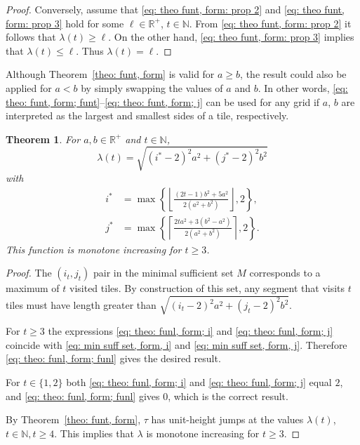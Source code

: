 \documentclass[12pt, a4paper]{article}
\newcommand{\funt}{\tau} %
\newcommand{\funl}{\lambda} %
\newcommand{\len}{\ell} %
\newcommand{\tiles}{t} %
\newcommand{\isoli}{i^\ast}
\newcommand{\jsoli}{j^\ast}
\newcommand{\mss}{M}
\newcommand{\touches}{visits}
\newcommand{\touched}{visited}
\newtheorem{theorem}{Theorem}%
\begin{document}
\begin{proof}
Conversely, assume that \eqref{eq: theo funt, form: prop 2} and \eqref{eq: theo funt, form: prop 3} hold for some $\len \in \mathbb R^+$, $\tiles \in \mathbb N$. From \eqref{eq: theo funt, form: prop 2} it follows that  $\funl(\tiles) \geq \len$. On the other hand, \eqref{eq: theo funt, form: prop 3} implies that $\funl(\tiles) \leq \len$. Thus $\funl(\tiles)=\len$.
\end{proof}

Although Theorem~\ref{theo: funt, form} is valid for $a \geq b$, the result could also be applied for $a < b$ by simply swapping the values of $a$ and $b$. In other words, \eqref{eq: theo: funt, form; funt}--\eqref{eq: theo: funt, form; j}
can be used for any grid if $a$, $b$ are interpreted as the largest and smallest sides of a tile, respectively.

\begin{theorem}
\label{theo: funl, form}
For $a, b \in \mathbb R^+$ and $\tiles \in \mathbb N$,
\begin{equation}
\label{eq: theo: funl, form; funl}
\funl(\tiles) = \sqrt{(\isoli-2)^2 a^2 + (\jsoli-2)^2 b^2}
\end{equation}
with
\begin{align}
\label{eq: theo: funl, form; i}
\isoli &= \max\left\{ \left\lfloor \frac {(2\tiles-1)b^2+5a^2}{2(a^2+b^2)} \right\rfloor, 2 \right\}, \\
\label{eq: theo: funl, form; j}
\jsoli &= \max\left\{ \left\lceil \frac {2\tiles a^2 + 3(b^2-a^2)}{2(a^2+b^2)} \right\rceil, 2 \right\}.
\end{align}
This function is monotone increasing for $\tiles \geq 3$.
\end{theorem}

\begin{proof}
The $(i_\tiles,j_\tiles)$ pair in the minimal sufficient set $\mss$ corresponds to a maximum of $\tiles$ \touched{} tiles. By construction of this set, any segment that \touches{} $\tiles$ tiles must have length greater than $\sqrt{(i_\tiles-2)^2a^2 + (j_\tiles-2)^2b^2}$.

For $\tiles \geq 3$ the expressions \eqref{eq: theo: funl, form; i} and \eqref{eq: theo: funl, form; j} coincide with \eqref{eq: min suff set, form, i} and \eqref{eq: min suff set, form, j}. Therefore \eqref{eq: theo: funl, form; funl} gives the desired result.
	
For $\tiles \in \{1, 2\}$ both \eqref{eq: theo: funl, form; i} and \eqref{eq: theo: funl, form; j} equal $2$, and \eqref{eq: theo: funl, form; funl} gives $0$, which is the correct result.

By Theorem~\ref{theo: funt, form}, $\funt$ has unit-height jumps at the values $\funl(\tiles)$, $\tiles \in \mathbb N, \tiles \geq 4$. This implies that $\funl$ is monotone increasing for $\tiles \geq 3$.
\end{proof}
\end{document}
